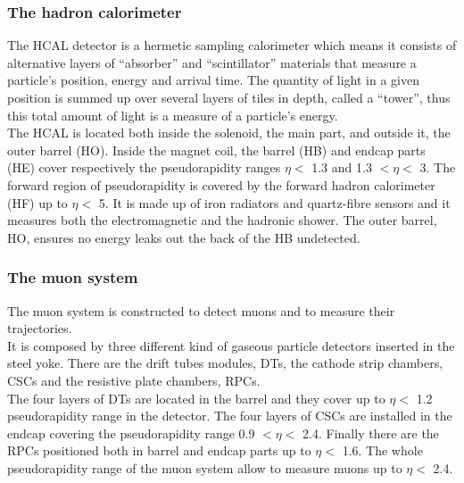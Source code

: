 \subsubsection{The hadron calorimeter}
The HCAL detector is a hermetic sampling calorimeter which means it
consists of alternative layers of ``absorber'' and ``scintillator''
materials that measure a particle’s position, energy and arrival time.
The quantity of light in a given position is summed up over several
layers of tiles in depth, called a “tower”, thus this total amount of
light is a measure of a particle’s energy.\\
The HCAL is located both inside the solenoid, the main part, and
outside it, the outer barrel (HO). 
Inside the magnet coil, the barrel (HB) and endcap parts (HE) cover
respectively the pseudorapidity
ranges $\eta<$ 1.3 and 1.3 $<\eta<$ 3.
The forward region of pseudorapidity is covered by the forward hadron
calorimeter (HF) up to $\eta<$ 5. It is made up of iron radiators and
quartz-fibre sensors and it measures both the electromagnetic and the hadronic shower. 
The outer barrel, HO, ensures no energy leaks out the
back of the HB undetected.

\subsubsection{The muon system}\label{sec:muonsystem}
The muon system is constructed to detect muons and to measure their trajectories.\\ 
It is composed by three different kind of gaseous particle
detectors inserted in the steel yoke. There are the drift tubes
modules, DTs, the cathode strip chambers, CSCs and the resistive plate
chambers, RPCs.\\
The four layers of DTs are located in the barrel and they cover up to
$\eta<$ 1.2 pseudorapidity range in the detector. The four layers of
CSCs are installed in the endcap covering the pseudorapidity range 0.9
$<\eta<$ 2.4. Finally there are the RPCs positioned both in barrel
and endcap parts up to $\eta<$ 1.6. The whole pseudorapidity range of
the muon system allow to measure muons up to $\eta<$ 2.4.

